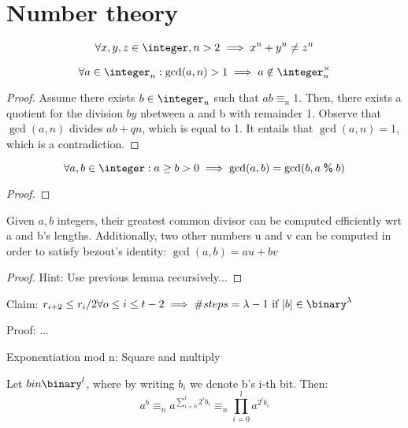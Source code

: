 
\section{Number theory}

\begin{theorem}
    \[
        \forall x, y, z \in \integer, n > 2 \implies x^n + y^n \neq z^n
    \]
\end{theorem}

\begin{lemma}
    \[
        \forall a \in \integer_n : \gcd(a, n) > 1 \implies a \notin \integer_n^\times
    \]
\end{lemma}

\begin{proof}
    Assume there exists $b \in \integer_n$ such that $ab \equiv_n 1$. Then, there exists a quotient for the division $by$ nbetween a and b with remainder 1. Observe that $\gcd(a, n)$ divides $ab + qn$, which is equal to 1. It entails that $\gcd(a, n) = 1$, which is a contradiction.
\end{proof}

\begin{lemma}
    \[
        \forall a, b \in \integer : a \geq b > 0  \implies \gcd(a, b) = \gcd(b, a \mathrel{\textup{\textsf{\%}}} b)
    \]
\end{lemma}

\begin{proof}
    
\end{proof}

\begin{theorem}
    Given $a, b$ integers, their greatest common divisor can be computed efficiently wrt a and b's lengths. Additionally, two other numbers u and v can be computed in order to satisfy bezout's identity: $\gcd(a, b) = au + bv$
\end{theorem}

\begin{proof}
    Hint: Use previous lemma recursively...
\end{proof}

Claim: $r_{i+2} \leq r_i/2 \forall o \leq i \leq t-2 \implies \#steps = \lambda - 1 \text{ if } |b| \in \binary^\lambda$

Proof: ...


\begin{definition}
    Exponentiation mod n: Square and multiply

    Let $b in \binary^l$, where by writing $b_i$ we denote b's i-th bit. Then:
    \[
        a^b \equiv_n a^{\sum_{i=0}^l 2^ib_i} \equiv_n \prod_{i=0}^l a^{2^ib_i} 
    \]
\end{definition}

